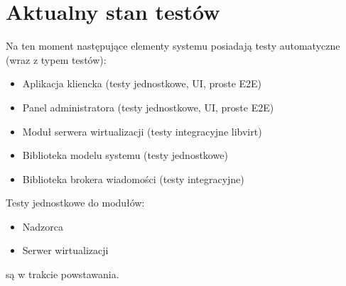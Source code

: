\documentclass[12pt]{article}
\begin{document}
\section{Aktualny stan testów}
Na ten moment następujące elementy systemu posiadają testy automatyczne (wraz z typem testów):
\begin{itemize}
	\item Aplikacja kliencka (testy jednostkowe, UI, proste E2E)
	\item Panel administratora (testy jednostkowe, UI, proste E2E)
	\item Moduł serwera wirtualizacji (testy integracyjne libvirt)
	\item Biblioteka modelu systemu (testy jednostkowe)
	\item Biblioteka brokera wiadomości (testy integracyjne)
\end{itemize}
Testy jednostkowe do modułów:
\begin{itemize}
	\item Nadzorca
	\item Serwer wirtualizacji
\end{itemize}
są w trakcie powstawania.
\end{document}
